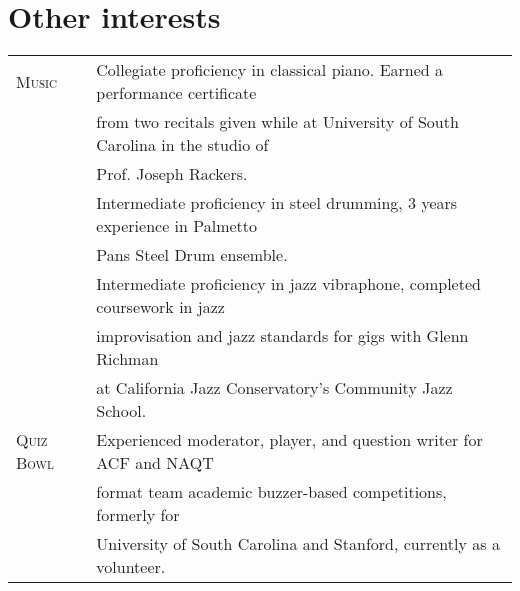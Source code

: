 \documentclass[a4paper,10pt]{article}
\begin{document}
\section{Other interests}
\begin{tabular}{ll}
 \textsc{Music} & Collegiate proficiency in classical piano.  Earned a performance certificate\\
 & from two recitals given while at University of South Carolina in the studio of\\
 & Prof. Joseph Rackers.\vspace{0.05in}\\
 & Intermediate proficiency in steel drumming, 3 years experience in Palmetto \\
 & Pans Steel Drum ensemble. \vspace{0.05in}\\
 & Intermediate proficiency in jazz vibraphone, completed coursework in jazz \\
 & improvisation and jazz standards for gigs with Glenn Richman\\
 & at California Jazz Conservatory's Community Jazz School.\vspace{0.05in}\\
 \textsc{Quiz Bowl} & Experienced moderator, player, and question writer for ACF and NAQT \\
 & format team academic buzzer-based competitions, formerly for \\
 & University of South Carolina and Stanford, currently as a volunteer.
\end{tabular}
\nocite{*}
\end{document}
